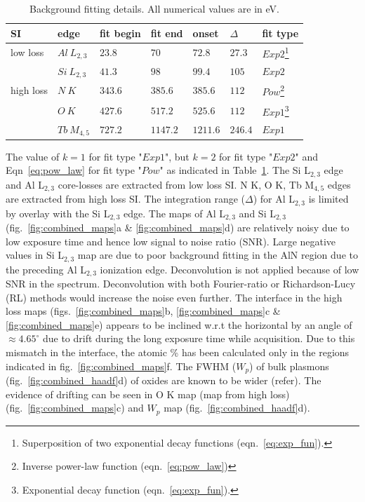 \documentclass[%
 aip,
rsi,%
 amsmath,amssymb,
 reprint,%
]{revtex4-1}
\begin{document}
\begin{table}[!ht]
	\caption{Background fitting details. All numerical values are in eV.}
    \label{tab:back_fit_table}
    \begin{ruledtabular}
    	\begin{tabular}{lllllll}
    		SI	&edge	 &fit begin&fit end&onset&$\Delta$&fit type 	\\ \hline
            low loss&$Al~L_{2,3}$& $23.8$&$70$&$72.8$&$27.3$&$Exp2$\footnote{Superposition of two exponential decay functions (eqn.~\ref{eq:exp_fun}).} 		\\
            		&$Si~L_{2,3}$&$41.3$&$98$&$99.4$&$105$&$Exp2$ 			\\ \hline
            high loss&$N~K$&$343.6$&$385.6$&$385.6$&$112$&$Pow$\footnote{Inverse power-law function (eqn.~\ref{eq:pow_law})} 			\\
                	&$O~K$&$427.6$&$517.2$&$525.6$&$112$&$Exp1$\footnote{Exponential decay function (eqn.~\ref{eq:exp_fun}).} 			\\
            		&$Tb~M_{4,5}$&$727.2$&$1147.2$&$1211.6$&$246.4$&$Exp1$ 	\\
    	\end{tabular}
    \end{ruledtabular}
\end{table}
The value of $k = 1$ for fit type "$Exp1$", but $k = 2$ for fit type "$Exp2$" and Eqn~\ref{eq:pow_law} for fit type "$Pow$" as indicated in Table~\ref{tab:back_fit_table}. The Si L$_{2,3}$ edge and Al L$_{2,3}$ core-losses are extracted from low loss SI. N K, O K, Tb M$_{4,5}$ edges are extracted from high loss SI. The integration range ($\Delta$) for Al L$_{2,3}$ is limited by overlay with the Si L$_{2,3}$ edge. The maps of Al L$_{2,3}$ and Si L$_{2,3}$ (fig.~\ref{fig:combined_maps}a \& \ref{fig:combined_maps}d) are relatively noisy due to low exposure time and hence low signal to noise ratio (SNR). Large negative values in Si L$_{2,3}$ map are due to poor background fitting in the AlN region due to the preceding Al L$_{2,3}$ ionization edge. Deconvolution is not applied because of low SNR in the spectrum. Deconvolution with both Fourier-ratio or Richardson-Lucy (RL) methods would increase the noise even further. The interface in the high loss maps (figs.~\ref{fig:combined_maps}b, \ref{fig:combined_maps}c \& \ref{fig:combined_maps}e) appears to be inclined w.r.t the horizontal by an angle of $\approx4.65^\circ$ due to drift during the long exposure time while acquisition. Due to this mismatch in the interface, the atomic \% has been calculated only in the regions indicated in fig.~\ref{fig:combined_maps}f. The FWHM  ($W_p$) of bulk plasmons (fig.~\ref{fig:combined_haadf}d) of oxides are known to be wider (refer). The evidence of drifting can be seen in O K map (map from high loss) (fig.~\ref{fig:combined_maps}c) and $W_p$ map (fig.~\ref{fig:combined_haadf}d).
\end{document}
